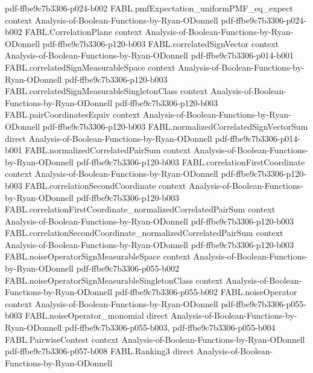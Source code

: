 \begin{theorem}
  {pdf-ffbe9c7b3306-p024-b002}
\proofstep
  {FABL.pmfExpectation_uniformPMF_eq_expect}
  {context}
  {Analysis-of-Boolean-Functions-by-Ryan-ODonnell}
  {pdf-ffbe9c7b3306-p024-b002}
\proofstep
  {FABL.CorrelationPlane}
  {context}
  {Analysis-of-Boolean-Functions-by-Ryan-ODonnell}
  {pdf-ffbe9c7b3306-p120-b003}
\proofstep
  {FABL.correlatedSignVector}
  {context}
  {Analysis-of-Boolean-Functions-by-Ryan-ODonnell}
  {pdf-ffbe9c7b3306-p014-b001}
\proofstep
  {FABL.correlatedSignMeasurableSpace}
  {context}
  {Analysis-of-Boolean-Functions-by-Ryan-ODonnell}
  {pdf-ffbe9c7b3306-p120-b003}
\proofstep
  {FABL.correlatedSignMeasurableSingletonClass}
  {context}
  {Analysis-of-Boolean-Functions-by-Ryan-ODonnell}
  {pdf-ffbe9c7b3306-p120-b003}
\proofstep
  {FABL.pairCoordinatesEquiv}
  {context}
  {Analysis-of-Boolean-Functions-by-Ryan-ODonnell}
  {pdf-ffbe9c7b3306-p120-b003}
\proofstep
  {FABL.normalizedCorrelatedSignVectorSum}
  {direct}
  {Analysis-of-Boolean-Functions-by-Ryan-ODonnell}
  {pdf-ffbe9c7b3306-p014-b001}
\proofstep
  {FABL.normalizedCorrelatedPairSum}
  {context}
  {Analysis-of-Boolean-Functions-by-Ryan-ODonnell}
  {pdf-ffbe9c7b3306-p120-b003}
\proofstep
  {FABL.correlationFirstCoordinate}
  {context}
  {Analysis-of-Boolean-Functions-by-Ryan-ODonnell}
  {pdf-ffbe9c7b3306-p120-b003}
\proofstep
  {FABL.correlationSecondCoordinate}
  {context}
  {Analysis-of-Boolean-Functions-by-Ryan-ODonnell}
  {pdf-ffbe9c7b3306-p120-b003}
\proofstep
  {FABL.correlationFirstCoordinate_normalizedCorrelatedPairSum}
  {context}
  {Analysis-of-Boolean-Functions-by-Ryan-ODonnell}
  {pdf-ffbe9c7b3306-p120-b003}
\proofstep
  {FABL.correlationSecondCoordinate_normalizedCorrelatedPairSum}
  {context}
  {Analysis-of-Boolean-Functions-by-Ryan-ODonnell}
  {pdf-ffbe9c7b3306-p120-b003}
\proofstep
  {FABL.noiseOperatorSignMeasurableSpace}
  {context}
  {Analysis-of-Boolean-Functions-by-Ryan-ODonnell}
  {pdf-ffbe9c7b3306-p055-b002}
\proofstep
  {FABL.noiseOperatorSignMeasurableSingletonClass}
  {context}
  {Analysis-of-Boolean-Functions-by-Ryan-ODonnell}
  {pdf-ffbe9c7b3306-p055-b002}
\proofstep
  {FABL.noiseOperator}
  {context}
  {Analysis-of-Boolean-Functions-by-Ryan-ODonnell}
  {pdf-ffbe9c7b3306-p055-b003}
\proofstep
  {FABL.noiseOperator_monomial}
  {direct}
  {Analysis-of-Boolean-Functions-by-Ryan-ODonnell}
  {pdf-ffbe9c7b3306-p055-b003,
    pdf-ffbe9c7b3306-p055-b004}
\proofstep
  {FABL.PairwiseContest}
  {context}
  {Analysis-of-Boolean-Functions-by-Ryan-ODonnell}
  {pdf-ffbe9c7b3306-p057-b008}
\proofstep
  {FABL.Ranking3}
  {direct}
  {Analysis-of-Boolean-Functions-by-Ryan-ODonnell}

\end{theorem}
